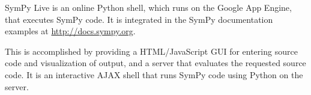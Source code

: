 SymPy Live is an online Python shell, which runs on the Google
App Engine, that executes SymPy code. It is integrated in the SymPy
documentation examples at \href{http://docs.sympy.org}{http://docs.sympy.org}.

This is accomplished by providing a HTML/JavaScript GUI for entering
source code and visualization of output, and a server that
evaluates the requested source code. It is an interactive AJAX shell
that runs SymPy code using Python on the server.
